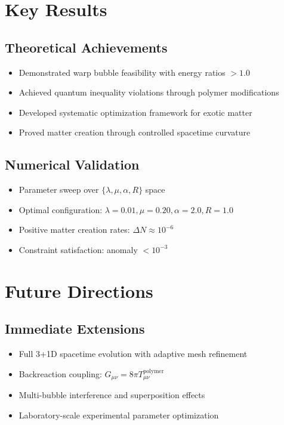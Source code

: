 \documentclass[11pt]{article}
\begin{document}
\section{Key Results}

\subsection{Theoretical Achievements}
\begin{itemize}
\item Demonstrated warp bubble feasibility with energy ratios $> 1.0$
\item Achieved quantum inequality violations through polymer modifications
\item Developed systematic optimization framework for exotic matter
\item Proved matter creation through controlled spacetime curvature
\end{itemize}

\subsection{Numerical Validation}
\begin{itemize}
\item Parameter sweep over $\{\lambda, \mu, \alpha, R\}$ space
\item Optimal configuration: $\lambda=0.01, \mu=0.20, \alpha=2.0, R=1.0$
\item Positive matter creation rates: $\Delta N \approx 10^{-6}$
\item Constraint satisfaction: anomaly $< 10^{-3}$
\end{itemize}

\section{Future Directions}

\subsection{Immediate Extensions}
\begin{itemize}
\item Full 3+1D spacetime evolution with adaptive mesh refinement
\item Backreaction coupling: $G_{\mu\nu} = 8\pi T_{\mu\nu}^{\text{polymer}}$
\item Multi-bubble interference and superposition effects
\item Laboratory-scale experimental parameter optimization
\end{itemize}
\end{document}
